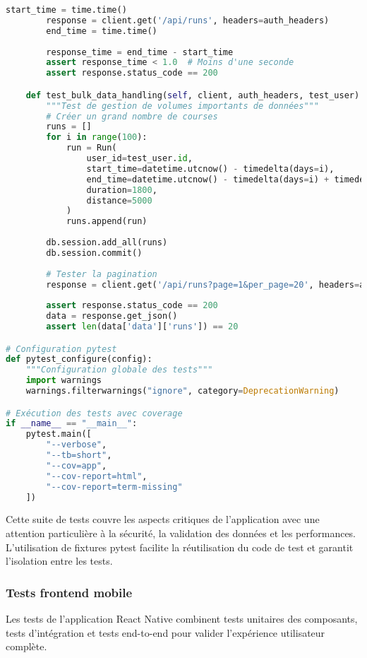 \begin{lstlisting}[language=python, caption=Suite de tests API complète]
        start_time = time.time()
        response = client.get('/api/runs', headers=auth_headers)
        end_time = time.time()
        
        response_time = end_time - start_time
        assert response_time < 1.0  # Moins d'une seconde
        assert response.status_code == 200

    def test_bulk_data_handling(self, client, auth_headers, test_user):
        """Test de gestion de volumes importants de données"""
        # Créer un grand nombre de courses
        runs = []
        for i in range(100):
            run = Run(
                user_id=test_user.id,
                start_time=datetime.utcnow() - timedelta(days=i),
                end_time=datetime.utcnow() - timedelta(days=i) + timedelta(minutes=30),
                duration=1800,
                distance=5000
            )
            runs.append(run)
        
        db.session.add_all(runs)
        db.session.commit()
        
        # Tester la pagination
        response = client.get('/api/runs?page=1&per_page=20', headers=auth_headers)
        
        assert response.status_code == 200
        data = response.get_json()
        assert len(data['data']['runs']) == 20

# Configuration pytest
def pytest_configure(config):
    """Configuration globale des tests"""
    import warnings
    warnings.filterwarnings("ignore", category=DeprecationWarning)

# Exécution des tests avec coverage
if __name__ == "__main__":
    pytest.main([
        "--verbose",
        "--tb=short",
        "--cov=app",
        "--cov-report=html",
        "--cov-report=term-missing"
    ])
\end{lstlisting}

Cette suite de tests couvre les aspects critiques de l'application avec une attention particulière à la sécurité, la validation des données et les performances. L'utilisation de fixtures pytest facilite la réutilisation du code de test et garantit l'isolation entre les tests.

\subsubsection{Tests frontend mobile}

Les tests de l'application React Native combinent tests unitaires des composants, tests d'intégration et tests end-to-end pour valider l'expérience utilisateur complète.

